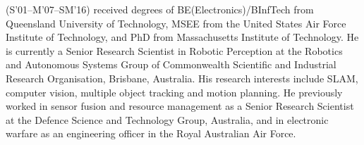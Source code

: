 (S’01–M’07–SM’16) received degrees of BE(Electronics)/BInfTech from Queensland University of Technology, MSEE from the United States Air Force Institute of Technology, and PhD from Massachusetts Institute of Technology. He is currently a Senior Research Scientist in Robotic Perception at the Robotics and Autonomous Systems Group of Commonwealth Scientific and Industrial Research Organisation, Brisbane, Australia. His research interests include SLAM, computer vision, multiple object tracking and motion planning. He previously worked in sensor fusion and resource management as a Senior Research Scientist at the Defence Science and Technology Group, Australia, and in electronic warfare as an engineering officer in the Royal Australian Air Force.
